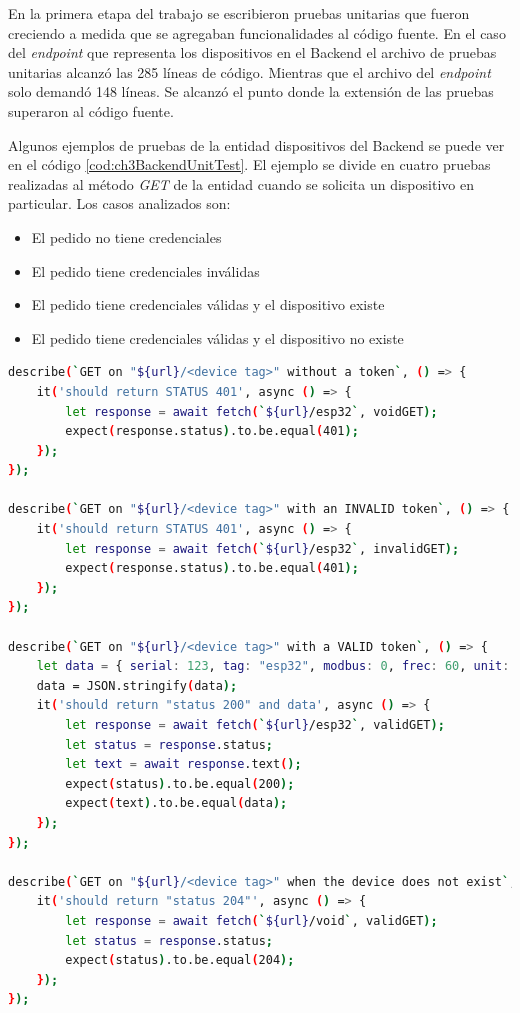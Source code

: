 En la primera etapa del trabajo se escribieron pruebas unitarias que fueron creciendo a medida que se agregaban funcionalidades al código fuente.
En el caso del \emph{endpoint} que representa los dispositivos en el Backend el archivo de pruebas unitarias alcanzó las 285 líneas de código.
Mientras que el archivo del \emph{endpoint} solo demandó 148 líneas.
Se alcanzó el punto donde la extensión de las pruebas superaron al código fuente.

Algunos ejemplos de pruebas de la entidad dispositivos del Backend se puede ver en el código \ref{cod:ch3BackendUnitTest}.
El ejemplo se divide en cuatro pruebas realizadas al método \emph{GET} de la entidad cuando se solicita un dispositivo en particular.
Los casos analizados son:

\begin{itemize}
	\item El pedido no tiene credenciales
	\item El pedido tiene credenciales inválidas
	\item El pedido tiene credenciales válidas y el dispositivo existe
	\item El pedido tiene credenciales válidas y el dispositivo no existe
\end{itemize}

\begin{lstlisting}[language=bash,label=cod:ch3BackendUnitTest,caption=Extracto de prueba unitaria Backend.]
describe(`GET on "${url}/<device tag>" without a token`, () => {
    it('should return STATUS 401', async () => {
        let response = await fetch(`${url}/esp32`, voidGET);
        expect(response.status).to.be.equal(401);
    });
});

describe(`GET on "${url}/<device tag>" with an INVALID token`, () => {
    it('should return STATUS 401', async () => {
        let response = await fetch(`${url}/esp32`, invalidGET);
        expect(response.status).to.be.equal(401);
    });
});

describe(`GET on "${url}/<device tag>" with a VALID token`, () => {
    let data = { serial: 123, tag: "esp32", modbus: 0, frec: 60, unit: "t" };
    data = JSON.stringify(data);
    it('should return "status 200" and data', async () => {
        let response = await fetch(`${url}/esp32`, validGET);
        let status = response.status;
        let text = await response.text();
        expect(status).to.be.equal(200);
        expect(text).to.be.equal(data);
    });
});

describe(`GET on "${url}/<device tag>" when the device does not exist`, () => {
    it('should return "status 204"', async () => {
        let response = await fetch(`${url}/void`, validGET);
        let status = response.status;
        expect(status).to.be.equal(204);
    });
});
\end{lstlisting}

